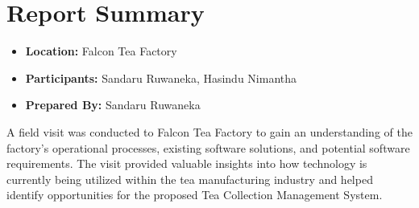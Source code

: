 \section*{Report Summary}
\begin{itemize}
  \item \textbf{Location:} Falcon Tea Factory
  \item \textbf{Participants:} Sandaru Ruwaneka, Hasindu Nimantha
  \item \textbf{Prepared By:} Sandaru Ruwaneka
\end{itemize}

\vspace{0.6em}
\noindent
A field visit was conducted to Falcon Tea Factory to gain an understanding of the factory's operational processes, existing software solutions, and potential software requirements. The visit provided valuable insights into how technology is currently being utilized within the tea manufacturing industry and helped identify opportunities for the proposed Tea Collection Management System.
